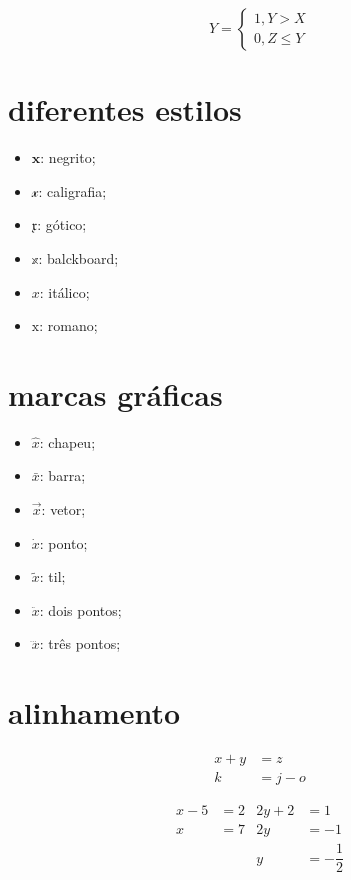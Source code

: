 \documentclass{article}
\begin{document}
\begin{equation}
    Y =
    \begin{cases}
        1, Y>X \\
        0, Z\le Y
    \end{cases}
\end{equation}

\section{diferentes estilos}

\begin{itemize}
    \item $\mathbf{x}$: negrito;
    \item $\mathcal{x}$: caligrafia;
    \item $\mathfrak{x}$: gótico;
    \item $\mathbb{x}$: balckboard;
    \item $\mathit{x}$: itálico;
    \item $\mathrm{x}$: romano;
\end{itemize}

\section{marcas gráficas}

\begin{itemize}
    \item $\hat{x}$: chapeu;
    \item $\bar{x}$: barra;
    \item $\vec{x}$: vetor;
    \item $\dot{x}$: ponto;
    \item $\tilde{x}$: til;
    \item $\ddot{x}$: dois pontos;
    \item $\dddot{x}$: três pontos;
\end{itemize}

\newpage

\section{alinhamento}

\begin{align*}
    x + y &= z \\
    k &= j - o
\end{align*}

\begin{align*}
    x - 5 &= 2 & 2y + 2 &= 1 \\
    x &= 7 & 2y &= -1 \\
    & & y &= - \dfrac{1}{2}
\end{align*}
\end{document}
